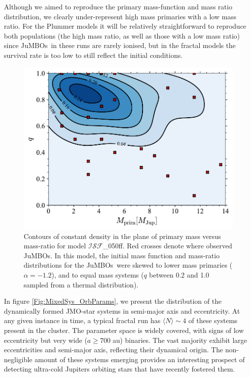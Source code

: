 \documentclass[submission,phys]{lib/SciPost}
\newcommand{\jumbos}{\mbox{JuMBOs}}
\begin{document}
Although we aimed to reproduce the primary mass-function and mass
ratio distribution, we clearly under-represent high mass primaries
with a low mass ratio. For the Plummer models it will be relatively
straightforward to reproduce both populations (the high mass ratio, as
well as those with a low mass ratio) since \jumbos\, in these runs are
rarely ionised, but in the fractal models the survival rate is too low
to still reflect the initial conditions.

   \begin{figure}
    \centering
    \includegraphics[width=0.75\columnwidth]{figures/Fractal_rvir0.5_Obs_mass_distr.pdf}
    \caption{Contours of constant density in the plane of primary mass
      versus mass-ratio for model $\mathcal{ISF}$\_050ff. Red crosses
      denote where observed \jumbos.  In this model, the initial mass
      function and mass-ratio distributions for the \jumbos\, were
      skewed to lower mass primaries ($\alpha = -1.2$), and to equal
      mass systems ($q$ between 0.2 and 1.0 sampled from a thermal
      distribution).  }
         \label{Fig:FractalObs_mdistr}
   \end{figure}

In figure \ref{Fig:MixedSys_OrbParams}, we present the distribution of
the dynamically formed JMO-star systems in semi-major axis and eccentricity.
At any given instance in time, a typical fractal run has $\langle N\rangle \sim 
4$ of these systems present in the cluster. The parameter space
is widely covered, with signs of low eccentricity but very wide
($a\geq700$ au) binaries. The vast majority exhibit
large eccentricities and semi-major axis, reflecting their dynamical
origin. The non-negligible amount of these systems emerging provides an
interesting prospect of detecting ultra-cold Jupiters orbiting stars
that have recently fostered them.
\end{document}
